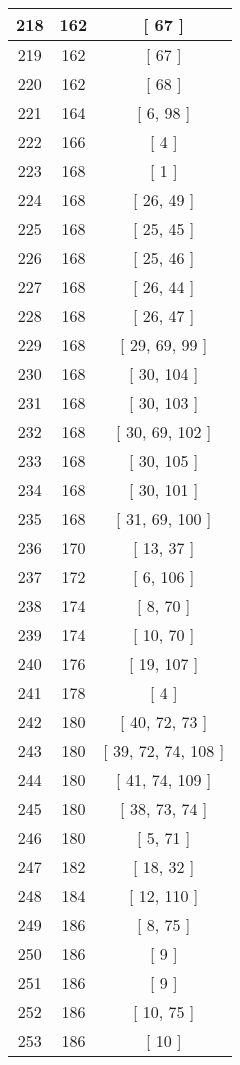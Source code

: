 \begin{center}
\begin{longtable}[H]{|| c c c ||}
\hline
218 & 162 & [ 67 ] \\ 
\hline
219 & 162 & [ 67 ] \\ 
\hline
220 & 162 & [ 68 ] \\ 
\hline
221 & 164 & [ 6, 98 ] \\ 
\hline
222 & 166 & [ 4 ] \\ 
\hline
223 & 168 & [ 1 ] \\ 
\hline
224 & 168 & [ 26, 49 ] \\ 
\hline
225 & 168 & [ 25, 45 ] \\ 
\hline
226 & 168 & [ 25, 46 ] \\ 
\hline
227 & 168 & [ 26, 44 ] \\ 
\hline
228 & 168 & [ 26, 47 ] \\ 
\hline
229 & 168 & [ 29, 69, 99 ] \\ 
\hline
230 & 168 & [ 30, 104 ] \\ 
\hline
231 & 168 & [ 30, 103 ] \\ 
\hline
232 & 168 & [ 30, 69, 102 ] \\ 
\hline
233 & 168 & [ 30, 105 ] \\ 
\hline
234 & 168 & [ 30, 101 ] \\ 
\hline
235 & 168 & [ 31, 69, 100 ] \\ 
\hline
236 & 170 & [ 13, 37 ] \\ 
\hline
237 & 172 & [ 6, 106 ] \\ 
\hline
238 & 174 & [ 8, 70 ] \\ 
\hline
239 & 174 & [ 10, 70 ] \\ 
\hline
240 & 176 & [ 19, 107 ] \\ 
\hline
241 & 178 & [ 4 ] \\ 
\hline
242 & 180 & [ 40, 72, 73 ] \\ 
\hline
243 & 180 & [ 39, 72, 74, 108 ] \\ 
\hline
244 & 180 & [ 41, 74, 109 ] \\ 
\hline
245 & 180 & [ 38, 73, 74 ] \\ 
\hline
246 & 180 & [ 5, 71 ] \\ 
\hline
247 & 182 & [ 18, 32 ] \\ 
\hline
248 & 184 & [ 12, 110 ] \\ 
\hline
249 & 186 & [ 8, 75 ] \\ 
\hline
250 & 186 & [ 9 ] \\ 
\hline
251 & 186 & [ 9 ] \\ 
\hline
252 & 186 & [ 10, 75 ] \\ 
\hline
253 & 186 & [ 10 ] \\ 

\end{longtable}
\end{center}
